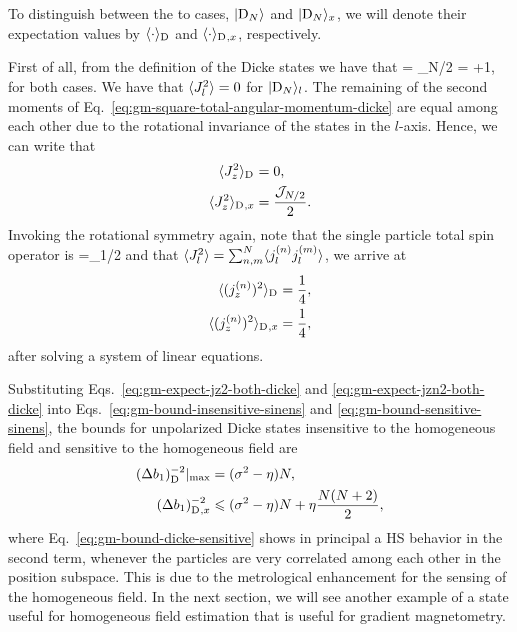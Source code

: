 To distinguish between the to cases, $\vert{\ensuremath{\textnormal{D}_{N}}}\rangle$ and $\vert{\ensuremath{\textnormal{D}_{N}}}\rangle_x$, we will denote their expectation values by $\langle{\cdot}\rangle_{\textnormal{D}_{}}$ and $\langle{\cdot}\rangle_{\textnormal{D}_{},x}$, respectively.

First of all, from the definition of the Dicke states we have that
\be
   = _{N/2} = \lpar{}+1\rpar,
  \label{eq:gm-square-total-angular-momentum-dicke}
\ee
for both cases.
We have that $\langle{J_l^2}\rangle=0$ for $\vert{\ensuremath{\textnormal{D}_{N}}}\rangle_l$.
The remaining of the second moments of Eq.~\eqref{eq:gm-square-total-angular-momentum-dicke} are equal among each other due to the rotational invariance of the states in the $l$-axis.
Hence, we can write that
\begin{subequations}
  \begin{align}
    \langle{J_z^2}\rangle_{\textnormal{D}_{}} &= 0,\\
    \langle{J_z^2}\rangle_{\textnormal{D}_{},x} &= \frac{\mathcal{J}_{N/2}}{2}.
  \end{align}
  \label{eq:gm-expect-jz2-both-dicke}
\end{subequations}
Invoking the rotational symmetry again, note that the single particle total spin operator is
\be
  =_{1/2}
\ee
and that $\langle{J_l^2}\rangle=\sum_{n,m}^N \langle{j_l^{(n)}j_l^{(m)}}\rangle$, we arrive at
\begin{subequations}
  \begin{align}
    \langle{(j_z^{(n)})^2}\rangle_{\textnormal{D}_{}}   &= \frac{1}{4},\\
    \langle{(j_z^{(n)})^2}\rangle_{\textnormal{D}_{},x} &= \frac{1}{4},
  \end{align}
  \label{eq:gm-expect-jzn2-both-dicke}
\end{subequations}
after solving a system of linear equations.

Substituting Eqs.~\eqref{eq:gm-expect-jz2-both-dicke} and \eqref{eq:gm-expect-jzn2-both-dicke} into Eqs.~\eqref{eq:gm-bound-insensitive-sinens} and \eqref{eq:gm-bound-sensitive-sinens}, the bounds for unpolarized Dicke states insensitive to the homogeneous field and sensitive to the homogeneous field are
\begin{subequations}
  \begin{align}
    (\Delta b_1 )^{-2}_{\textnormal{D}_{}}|_{\max} &= (\sigma^2 -\eta)N,
    \label{eq:gm-bound-dicke-insensitive} \\
    (\Delta b_1 )^{-2}_{\textnormal{D}_{},x} &\leqslant (\sigma^2 -\eta)N + \eta \frac{N(N+2)}{2},
    \label{eq:gm-bound-dicke-sensitive}
  \end{align}
\end{subequations}
where Eq.~\eqref{eq:gm-bound-dicke-sensitive} shows in principal a HS behavior in the second term, whenever the particles are very correlated among each other in the position subspace.
This is due to the metrological enhancement for the sensing of the homogeneous field.
In the next section, we will see another example of a state useful for homogeneous field estimation that is useful for gradient magnetometry.

